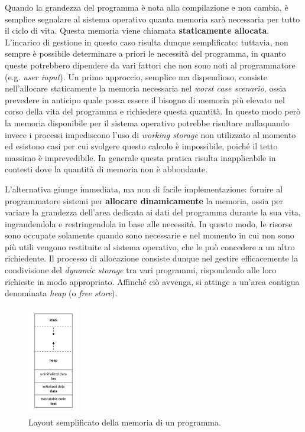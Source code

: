 Quando la grandezza del programma è nota alla compilazione e non cambia, è semplice segnalare al sistema operativo quanta memoria sarà necessaria per tutto il ciclo di vita. Questa memoria viene chiamata \textbf{staticamente allocata}. L'incarico di gestione in questo caso risulta dunque semplificato: tuttavia, non sempre è possibile determinare a priori le necessità del programma, in quanto queste potrebbero dipendere da vari fattori che non sono noti al programmatore (e.g. \textit{user input}). Un primo approccio, semplice ma dispendioso, consiste nell'allocare staticamente la memoria necessaria nel \textit{worst case scenario}, ossia prevedere in anticipo quale possa essere il bisogno di memoria più elevato nel corso della vita del programma e richiedere questa quantità. In questo modo però la memoria disponibile per il sistema operativo potrebbe risultare nulla\footnotemark quando invece i processi impediscono l'uso di \textit{working storage} non utilizzato al momento ed esistono casi per cui svolgere questo calcolo è impossibile, poiché il tetto massimo è imprevedibile. In generale questa pratica risulta inapplicabile in contesti dove la quantità di memoria non è abbondante.


L'alternativa giunge immediata, ma non di facile implementazione: fornire al programmatore sistemi per \textbf{allocare dinamicamente} la memoria, ossia per variare la grandezza dell'area dedicata ai dati del programma durante la sua vita, ingrandendola e restringendola in base alle necessità. In questo modo, le risorse sono occupate solamente quando sono necessarie e nel momento in cui non sono più utili vengono restituite al sistema operativo, che le può concedere a un altro richiedente. Il processo di allocazione consiste dunque nel gestire efficacemente la condivisione del \textit{dynamic storage} tra vari programmi, rispondendo alle loro richieste in modo appropriato. Affinché ciò avvenga, si attinge a un'area contigua denominata \textit{heap} (o \textit{free store}). 

\begin{figure}[H]
  \centering
  \includegraphics[width=0.2\textwidth]{images/program_memory_layout.png}
  \caption{Layout semplificato della memoria di un programma.}
  \label{fig:program_memory_layout}
\end{figure}

